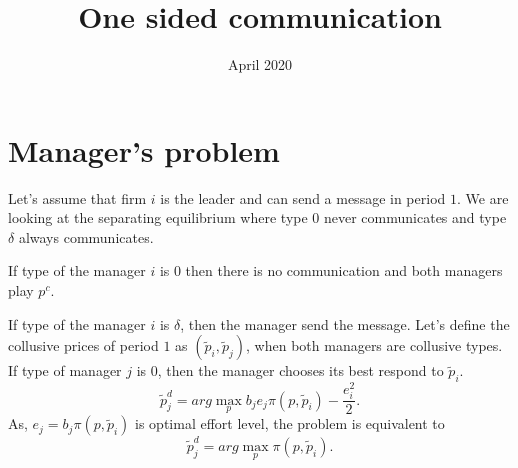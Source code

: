 \documentclass{article}
\title{One sided communication}
\author{}
\date{April 2020}
\begin{document}
\maketitle

\section{Manager's problem}
Let's assume that firm $i$ is the leader and can send a message in period $1$. We are looking at the separating equilibrium where type $0$ never communicates and type $\delta$ always communicates.

If type of the manager $i$ is $0$ then there is no communication and both managers play $p^c$.

If type of the manager $i$ is $\delta$, then the manager send the message. Let's define the collusive prices of period $1$ as $(\tilde{p}_i, \tilde{p}_j)$, when both managers are collusive types. If type of manager $j$ is $0$, then the manager chooses its best respond to $\tilde{p}_i$.
\begin{equation}
    \tilde{p}_j^d = arg \max_{p} b_j e_j \pi(p,\tilde{p}_i)-\frac{e_i^2}{2}.
\end{equation}
As, $e_j=b_j \pi(p,\tilde{p}_i)$ is optimal effort level, the problem is equivalent to
\begin{equation}
    \tilde{p}_j^d = arg \max_{p} \pi(p,\tilde{p}_i).
\end{equation}
\end{document}

